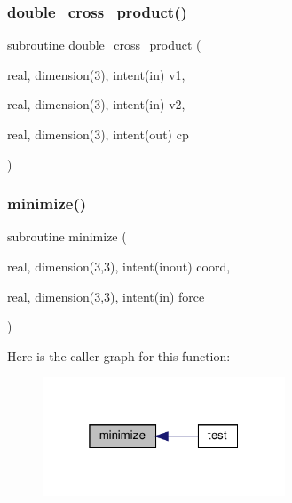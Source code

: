 \subsubsection{\texorpdfstring{double\+\_\+cross\+\_\+product()}{double\_cross\_product()}}
{\footnotesize\ttfamily subroutine double\+\_\+cross\+\_\+product (\begin{DoxyParamCaption}\item[{real, dimension(3), intent(in)}]{v1,  }\item[{real, dimension(3), intent(in)}]{v2,  }\item[{real, dimension(3), intent(out)}]{cp }\end{DoxyParamCaption})}

\mbox{\label{water__optimize_8f90_adad91e5491ec76f67219e4754299ceac}} 
\subsubsection{\texorpdfstring{minimize()}{minimize()}}
{\footnotesize\ttfamily subroutine minimize (\begin{DoxyParamCaption}\item[{real, dimension(3,3), intent(inout)}]{coord,  }\item[{real, dimension(3,3), intent(in)}]{force }\end{DoxyParamCaption})}

Here is the caller graph for this function\+:
\nopagebreak
\begin{figure}[H]
\begin{center}
\leavevmode
\includegraphics[width=205pt]{water__optimize_8f90_adad91e5491ec76f67219e4754299ceac_icgraph}
\end{center}
\end{figure}
\mbox{\label{water__optimize_8f90_aa6798098feec21c5053572f5c5043c28}} 
